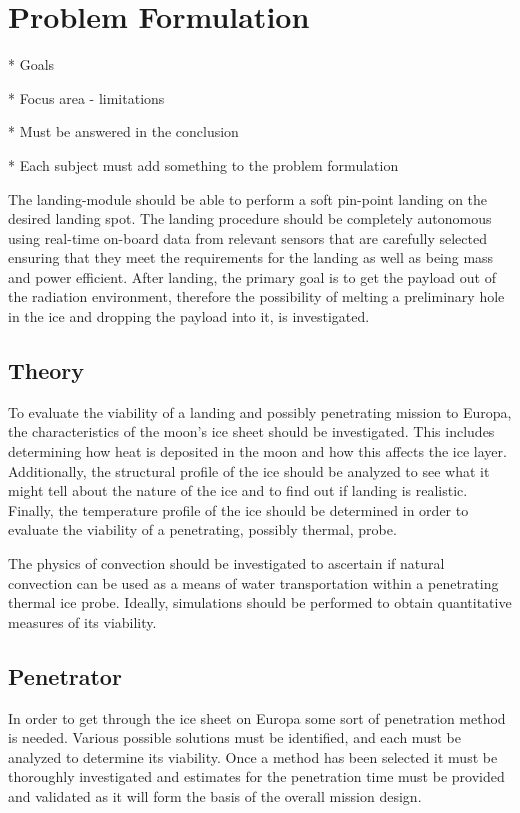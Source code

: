 \chapter{Problem Formulation}

* Goals

* Focus area - limitations

* Must be answered in the conclusion

* Each subject must add something to the problem formulation

The landing-module should be able to perform a soft pin-point landing on the desired landing spot. The landing procedure should be completely autonomous using real-time on-board data from relevant sensors that are carefully selected ensuring that they meet the requirements for the landing as well as being mass and power efficient. After landing, the primary goal is to get the payload out of the radiation environment, therefore the possibility of melting a preliminary hole in the ice and dropping the payload into it, is investigated.

\section{Theory}
To evaluate the viability of a landing and possibly penetrating mission to Europa, the characteristics of the moon's ice sheet should be investigated. This includes determining how heat is deposited in the moon and how this affects the ice layer. Additionally, the structural profile of the ice should be analyzed to see what it might tell about the nature of the ice and to find out if landing is realistic. Finally, the temperature profile of the ice should be determined in order to evaluate the viability of a penetrating, possibly thermal, probe.

The physics of convection should be investigated to ascertain if natural convection can be used as a means of water transportation within a penetrating thermal ice probe. Ideally, simulations should be performed to obtain quantitative measures of its viability.

\section{Penetrator}
In order to get through the ice sheet on Europa some sort of penetration method is needed. Various possible solutions must be identified, and each must be analyzed to determine its viability. Once a method has been selected it must be thoroughly investigated and estimates for the penetration time must be provided and validated as it will form the basis of the overall mission design.

